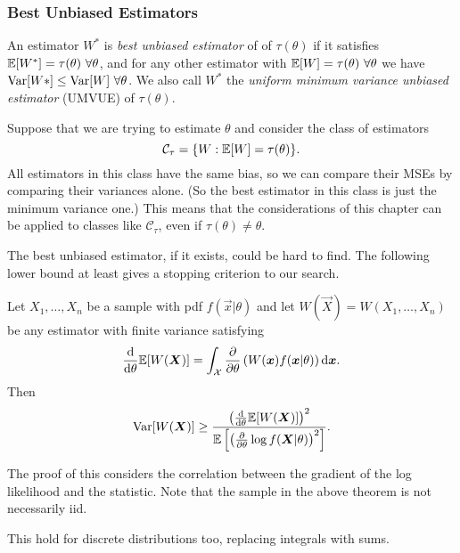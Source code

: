 \subsubsection{Best Unbiased Estimators}

\begin{definition}
    An estimator $W^*$ is \emph{best unbiased estimator} of of $\tau(\theta)$ if it satisfies $\mathbb{E}{}[W^*] = \tau(\theta) \,\, \forall \theta$, and for any other estimator with $\mathbb{E}{}[W] = \tau(\theta) \,\, \forall \theta$ we have $\text{Var}{}[W*] \leq \text{Var}{}[W] \,\, \forall \theta$. We also call $W^*$ the \emph{uniform minimum variance unbiased estimator} (UMVUE) of $\tau(\theta)$.
\end{definition}

\begin{remark}
    Suppose that we are trying to estimate $\theta$ and consider the class of estimators
    \[
        \mathcal{C}_\tau = \{W: \mathbb{E}{}[W] = \tau(\theta)\}.
    \]
    All estimators in this class have the same bias, so we can compare their MSEs by comparing their variances alone. (So the best estimator in this class is just the minimum variance one.) This means that the considerations of this chapter can be applied to classes like $\mathcal{C}_\tau$, even if $\tau(\theta) \neq \theta$.
\end{remark}

The best unbiased estimator, if it exists, could be hard to find. The following lower bound at least gives a stopping criterion to our search.
 
\begin{theorem}
    Let $X_1, \dots, X_n$ be a sample with pdf $f(\vec{x}\vert{}\theta)$ and let $W(\vec{X}) = W(X_1, \dots, X_n)$ be any estimator with finite variance satisfying
    \[
        \frac{\text{d}{}}{\text{d}{} \theta} \mathbb{E}{}[W(\bm{X})] = \int_{\mathcal{X}{}} \frac{\partial{}}{\partial{} \theta} \left(W(\bm{x}) f(\bm{x}\vert{}\theta) \right)\text{d}{}\bm{x}.
    \]
    Then
    \[
        \text{Var}{}[W(\bm{X})] \geq \frac{\left(\frac{\text{d}{}}{\text{d}{} \theta} \mathbb{E}{}[W(\bm{X})] \right)^2}{\mathbb{E}{}\left[ \left(\frac{\partial{}}{\partial{} \theta} \log f(\bm{X} \vert{} \theta) \right)^2 \right]}.
    \]
\end{theorem}

The proof of this considers the correlation between the gradient of the log likelihood and the statistic. Note that the sample in the above theorem is not necessarily iid.

\begin{remark}
    This hold for discrete distributions too, replacing integrals with sums.
\end{remark}


